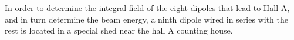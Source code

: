 

In order to determine the integral field of the eight dipoles that lead to Hall A, and 
in turn determine the beam energy, a ninth dipole wired in series with the rest is 
located in a special shed near the hall A counting house.

